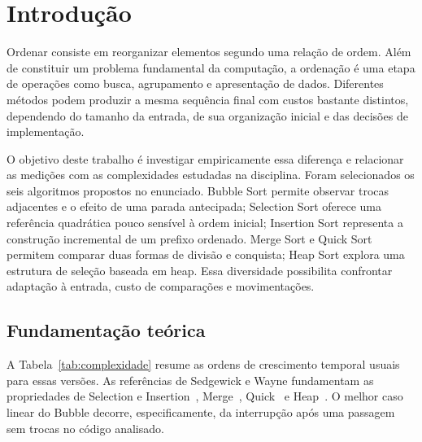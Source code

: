 \documentclass[12pt]{uftex}
\begin{document}
\chapter{Introdução}
Ordenar consiste em reorganizar elementos segundo uma relação de ordem. Além de constituir um problema fundamental da computação, a ordenação é uma etapa de operações como busca, agrupamento e apresentação de dados. Diferentes métodos podem produzir a mesma sequência final com custos bastante distintos, dependendo do tamanho da entrada, de sua organização inicial e das decisões de implementação.

O objetivo deste trabalho é investigar empiricamente essa diferença e relacionar as medições com as complexidades estudadas na disciplina. Foram selecionados os seis algoritmos propostos no enunciado. Bubble Sort permite observar trocas adjacentes e o efeito de uma parada antecipada; Selection Sort oferece uma referência quadrática pouco sensível à ordem inicial; Insertion Sort representa a construção incremental de um prefixo ordenado. Merge Sort e Quick Sort permitem comparar duas formas de divisão e conquista; Heap Sort explora uma estrutura de seleção baseada em heap. Essa diversidade possibilita confrontar adaptação à entrada, custo de comparações e movimentações.

\section{Fundamentação teórica}
A Tabela~\ref{tab:complexidade} resume as ordens de crescimento temporal usuais para essas versões. As referências de Sedgewick e Wayne fundamentam as propriedades de Selection e Insertion~\cite{elementary}, Merge~\cite{merge}, Quick~\cite{quick} e Heap~\cite{heap}. O melhor caso linear do Bubble decorre, especificamente, da interrupção após uma passagem sem trocas no código analisado.
\end{document}
